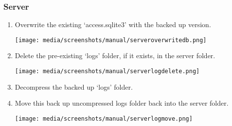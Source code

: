 \documentclass[12pt,a4paper]{report}
\begin{document}
        \subsubsection{Server}
            \begin{enumerate}
                \item Overwrite the existing `access.sqlite3' with the backed up version.
                \begin{center}
                \texttt{[image: media/screenshots/manual/serveroverwritedb.png]}
                \end{center}
                \item Delete the pre-existing `logs' folder, if it exists, in the server folder.
                \begin{center}
                \texttt{[image: media/screenshots/manual/serverlogdelete.png]}
                \end{center}
                \item Decompress the backed up `logs' folder.

                \item Move this back up uncompressed logs folder back into the server folder.
                \begin{center}
                \texttt{[image: media/screenshots/manual/serverlogmove.png]}
                \end{center}
            \end{enumerate}
\end{document}
